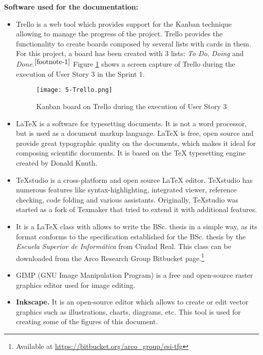 \textbf{Software used for the documentation:}
\begin{itemize}
	\item {} Trello is a web tool which provides support for the Kanban technique allowing to manage the progress of the project. Trello provides the functionality to create boards composed by several lists with cards in them. For this project, a board has been created with 3 lists: \emph{To Do}, \emph{Doing} and \emph{Done}.$^{\ref{footnote-1}}$ Figure \ref{fig:5-Trello} shows a screen capture of Trello during the execution of User Story 3 in the Sprint 1.
	
	\begin{figure}[!h]
		\begin{center}
			\texttt{[image: 5-Trello.png]}
			\caption{Kanban board on Trello during the execution of User Story 3}
			\label{fig:5-Trello}
		\end{center}
	\end{figure}
	
	\item {} \LaTeX{} is a software for typesetting documents. It is not a word processor, but is used as a document markup language. \LaTeX{} is free, open source and provide great typographic quality on the documents, which makes it ideal for composing scientific documents. It is based on the \TeX{} typesetting engine created by Donald Knuth.
	
	\item {} TeXstudio is a cross-platform and open source \LaTeX{} editor. TeXstudio has numerous features like syntax-highlighting, integrated viewer, reference checking, code folding and various assistants. Originally, TeXstudio was started as a fork of Texmaker that tried to extend it with additional features. 
	
	\item {} It is a \LaTeX{} class with allows to write the \ac{BSc.} thesis in a simple way, as its format conforms to the specification established for the \ac{BSc.} thesis by the \emph{Escuela Superior de Informática} from Ciudad Real. This class can be downloaded from the Arco Research Group Bitbucket page.\footnote{Available at \url{https://bitbucket.org/arco_group/esi-tfg}}
	
	\item {} GIMP (\ac{GNU} Image Manipulation Program) is a free and open-source raster graphics editor used for image editing.
	
	\item \textbf{Inkscape.} It is an open-source editor which allows to create or edit vector graphics such as illustrations, charts, diagrams, etc. This tool is used for creating some of the figures of this document.
	
\end{itemize}

